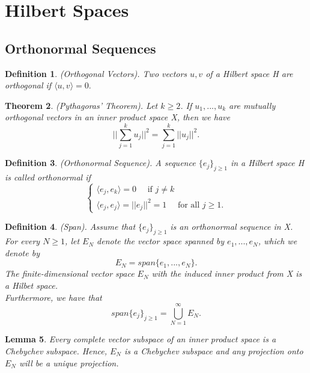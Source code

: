 \documentclass[twoside]{article}
\newcounter{lecnum}
\newtheorem{theorem}{Theorem}[lecnum]
\newtheorem{lemma}[theorem]{Lemma}
\newtheorem{definition}[theorem]{Definition}
\begin{document}
\section{Hilbert Spaces}
\subsection{Orthonormal Sequences}

\begin{definition}(Orthogonal Vectors). Two vectors $u, v$ of a Hilbert space H are orthogonal if $\langle u, v \rangle = 0.$
\end{definition}


\begin{theorem}(Pythagoras' Theorem). Let $k \geq 2$. If $u_1,...,u_k$ are mutually orthogonal vectors in an inner product space X, then we have 
$$
||\sum_{j=1}^ku_j||^2 = \sum_{j=1}^k||u_j||^2.
$$
\end{theorem}

\begin{definition}(Orthonormal Sequence). A sequence $\{e_j\}_{j \geq 1}$ in a Hilbert space H is called orthonormal if 
$$
\begin{cases}
\langle e_j, e_k \rangle = 0 \quad \text{ if } j \neq k\\
\langle e_j, e_j \rangle = ||e_j||^2 = 1 \quad \text{ for all } j \geq 1. 
\end{cases}
$$
\end{definition}

\begin{definition}(Span). Assume that $\{e_j\}_{j \geq 1}$ is an orthonormal sequence in X. For every $N \geq 1$, let $E_N$ denote the vector space spanned by $e_1,...,e_N$, which we denote by 
$$
E_N = span\{e_1,...,e_N\}.
$$
The finite-dimensional vector space $E_N$ with the induced inner product from X is a Hilbet space.\\
Furthermore, we have that 
$$
span\{e_j\}_{j \geq 1} = \bigcup_{N=1}^{\infty}E_N.
$$

\end{definition}

\begin{lemma}Every complete vector subspace of an inner product space is a Chebychev subspace. Hence, $E_N$ is a Chebychev subspace and any projection onto $E_N$ will be a unique projection.
\end{lemma}
\end{document}
